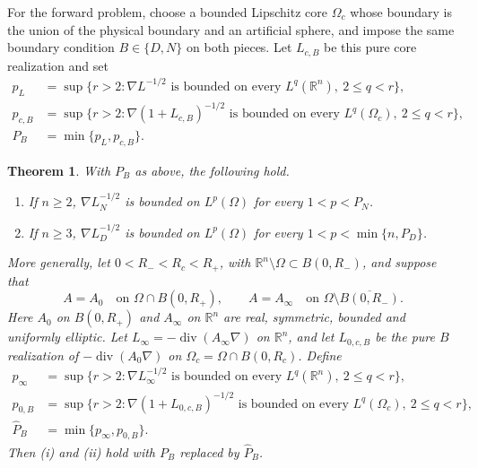 \documentclass[12pt]{amsart}
\newcommand\R{\mathbb{R}}
\newcommand{\diver}{\operatorname{div}}
\newtheorem{theorem}{Theorem}[section]
\theoremstyle{remark}
\begin{document}
For the forward problem, choose a bounded Lipschitz core $\Omega_c$ whose
boundary is the union of the physical boundary and an artificial sphere,
and impose the same boundary condition $B\in\{D,N\}$ on both pieces.  Let
$L_{c,B}$ be this pure core realization and set
\begin{align*}
 p_L&=\sup\bigl\{r>2:\nabla L^{-1/2}\text{ is bounded on every }
                     L^q(\R^n),\ 2\leq q<r\bigr\},\\
 p_{c,B}&=\sup\bigl\{r>2:\nabla(1+L_{c,B})^{-1/2}\text{ is bounded on every }
                     L^q(\Omega_c),\ 2\leq q<r\bigr\},\\
 P_B&=\min\{p_L,p_{c,B}\}.
\end{align*}


\begin{theorem}
\label{thm:intro-forward}
With $P_B$ as above, the following hold.
\begin{enumerate}[label=\textup{(\roman*)}]
\item If $n\geq2$, $\nabla L_N^{-1/2}$ is bounded on $L^p(\Omega)$ for
      every $1<p<P_N$.
\item If $n\geq3$, $\nabla L_D^{-1/2}$ is bounded on $L^p(\Omega)$ for
      every $1<p<\min\{n,P_D\}$.
\end{enumerate}
More generally, let $0<R_-<R_c<R_+$, with
$\R^n\setminus\Omega\subset B(0,R_-)$, and suppose that
\begin{equation}\label{eq:overlapping-models}
 A=A_0\quad\text{on }\Omega\cap B(0,R_+),
 \qquad
 A=A_\infty\quad\text{on }\Omega\setminus\overline{B(0,R_-)}.
\end{equation}
Here $A_0$ on $B(0,R_+)$ and $A_\infty$ on $\R^n$ are real,
symmetric, bounded and uniformly elliptic.  Let $L_\infty=-\diver(A_\infty\nabla)$ on $\R^n$, and
let $L_{0,c,B}$ be the pure $B$ realization of $-\diver(A_0\nabla)$ on
$\Omega_c=\Omega\cap B(0,R_c)$.  Define
\begin{align*}
 p_\infty&=\sup\bigl\{r>2:\nabla L_\infty^{-1/2}\text{ is bounded on every }
                  L^q(\R^n),\ 2\leq q<r\bigr\},\\
 p_{0,B}&=\sup\bigl\{r>2:\nabla(1+L_{0,c,B})^{-1/2}\text{ is bounded on every }
                  L^q(\Omega_c),\ 2\leq q<r\bigr\},\\
 \widehat P_B&=\min\{p_\infty,p_{0,B}\}.
\end{align*}
Then \textup{(i)} and \textup{(ii)} hold with $P_B$ replaced by
$\widehat P_B$.
\end{theorem}
\end{document}
